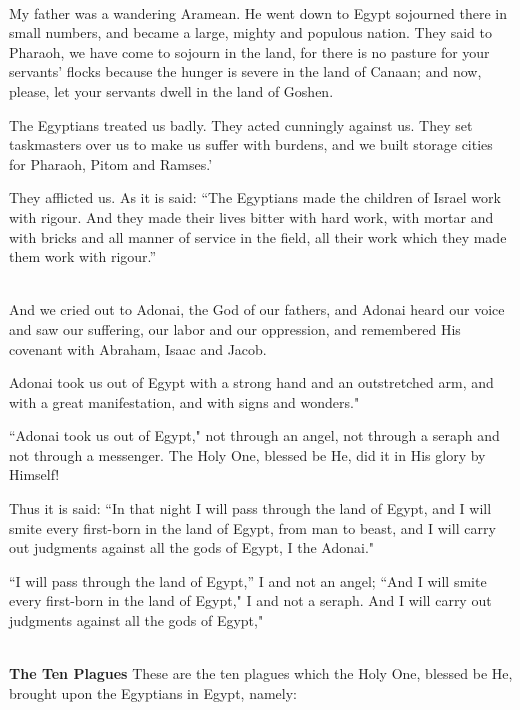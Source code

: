 \documentclass[12pt,a4wide,openany]{memoir}
\newcommand{\HgInst}[1]{{\noindent\sffamily{\bfseries{#1}}}}
\newenvironment{HgEnglish}{\strut\\\noindent}{\vspace{1em}}
\begin{document}
\begin{HgEnglish}
My father was a wandering Aramean. He went down to Egypt sojourned
there in small numbers, and became a large, mighty and populous
nation. They said to Pharaoh, we have come to sojourn in the land, for
there is no pasture for your servants' flocks because the hunger is
severe in the land of Canaan; and now, please, let your servants dwell
in the land of Goshen.

The Egyptians treated us badly. They acted cunningly against us. They
set taskmasters over us to make us suffer with burdens, and we built
storage cities for Pharaoh, Pitom and Ramses.'

They afflicted us. As it is said: ``The Egyptians made the children of Israel work with rigour. And they made their lives bitter with hard work, with mortar and with bricks and all manner of service in the field, all their work which they made them work with rigour.''
\end{HgEnglish}

\HgInst{Continue}
\begin{HgEnglish}
And we cried out to Adonai, the God of our fathers, and Adonai heard
our voice and saw our suffering, our labor and our oppression, and
remembered His covenant with Abraham, Isaac and Jacob.

Adonai took us out of Egypt with a strong hand and an outstretched
arm, and with a great manifestation, and with signs and wonders."

``Adonai took us out of Egypt," not through an angel, not through a
seraph and not through a messenger. The Holy One, blessed be He, did
it in His glory by Himself!

Thus it is said: ``In that night I will pass through the land of Egypt,
and I will smite every first-born in the land of Egypt, from man to
beast, and I will carry out judgments against all the gods of Egypt, I
the Adonai."

``I will pass through the land of Egypt,'' I and not an angel; ``And I
will smite every first-born in the land of Egypt," I and not a
seraph. And I will carry out judgments against all the gods of Egypt," 
\end{HgEnglish}

\newpage


\begin{HgEnglish}
\textbf{The Ten Plagues} These are the ten plagues which the Holy One, blessed be He, brought
upon the Egyptians in Egypt, namely:
\end{HgEnglish}
\end{document}
